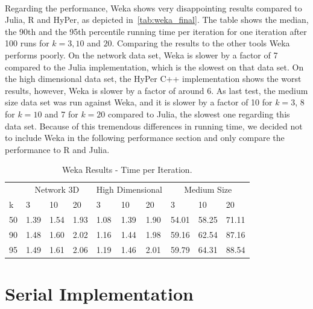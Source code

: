 \\
Regarding the performance, Weka shows very disappointing results compared to Julia, R and HyPer, as depicted in~\autoref{tab:weka_final}. The table shows the median, the 90th and the 95th percentile running time per iteration for one iteration after 100 runs for $k = 3, 10$ and $20$. Comparing the results to the other tools Weka performs poorly. On the network data set, Weka is slower by a factor of 7 compared to the Julia implementation, which is the slowest on that data set. On the high dimensional data set, the HyPer C++ implementation shows the worst results, however, Weka is slower by a factor of around 6. As last test, the medium size data set was run against Weka, and it is slower by a factor of 10 for $k = 3$, 8 for $k = 10$ and 7 for $k = 20$ compared to Julia, the slowest one regarding this data set. Because of this tremendous differences in running time, we decided not to include Weka in the following performance section and only compare the performance to R and Julia.

\begin{table}[htsb]
  \caption[Weka Results - Time per Iteration]{Weka Results - Time per Iteration.}
  \label{tab:weka_final}
  \centering
  \begin{tabular}{l l l l l l l l l l }
    \toprule
      & \multicolumn{3}{c}{Network 3D} & \multicolumn{3}{c}{High Dimensional} & \multicolumn{3}{c}{Medium Size}  \\
      k & 3 & 10 & 20 & 3 & 10 & 20 & 3 & 10 & 20 \\
    \midrule
      50  & 1.39 & 1.54 & 1.93 & 1.08 & 1.39 & 1.90 & 54.01 & 58.25 & 71.11 \\
      90  & 1.48 & 1.60 & 2.02 & 1.16 & 1.44 & 1.98 &59.16 & 62.54 & 87.16 \\
      95  & 1.49 & 1.61 & 2.06 & 1.19 & 1.46 & 2.01 & 59.79 & 64.31 & 88.54 \\
    \bottomrule
  \end{tabular}
\end{table}



\section{Serial Implementation}\label{section:serial}

